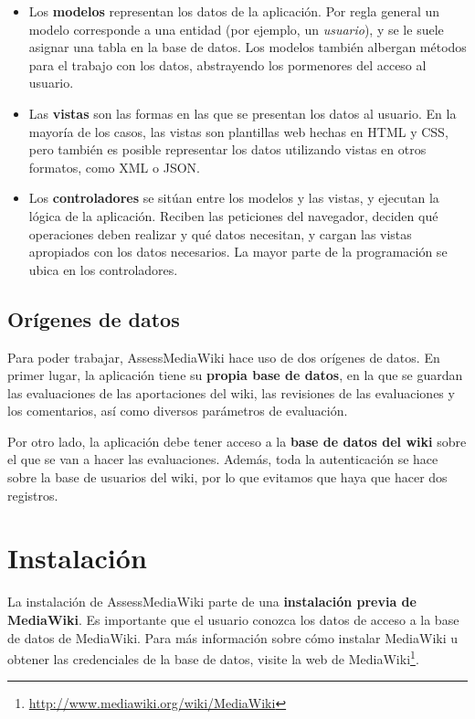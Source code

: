 \documentclass[11pt]{article}
\begin{document}
\begin{itemize}
\item Los \textbf{modelos} representan los datos de la aplicación. Por regla
  general un modelo corresponde a una entidad (por ejemplo, un
  \textit{usuario}), y se le suele asignar una tabla en la base de datos. Los
  modelos también albergan métodos para el trabajo con los datos, abstrayendo
  los pormenores del acceso al usuario.
\item Las \textbf{vistas} son las formas en las que se presentan los datos al
  usuario. En la mayoría de los casos, las vistas son plantillas web hechas en
  HTML y CSS, pero también es posible representar los datos utilizando vistas en
  otros formatos, como XML o JSON.
\item Los \textbf{controladores} se sitúan entre los modelos y las vistas, y
  ejecutan la lógica de la aplicación. Reciben las peticiones del navegador,
  deciden qué operaciones deben realizar y qué datos necesitan, y cargan las
  vistas apropiados con los datos necesarios. La mayor parte de la programación
  se ubica en los controladores.
\end{itemize}

\subsection{Orígenes de datos}

Para poder trabajar, AssessMediaWiki hace uso de dos orígenes de datos. En
primer lugar, la aplicación tiene su \textbf{propia base de datos}, en la que se
guardan las evaluaciones de las aportaciones del wiki, las revisiones de las
evaluaciones y los comentarios, así como diversos parámetros de evaluación.

Por otro lado, la aplicación debe tener acceso a la \textbf{base de datos del
  wiki} sobre el que se van a hacer las evaluaciones. Además, toda la
autenticación se hace sobre la base de usuarios del wiki, por lo que evitamos
que haya que hacer dos registros.

\section{Instalación}

La instalación de AssessMediaWiki parte de una \textbf{instalación previa de
  MediaWiki}. Es importante que el usuario conozca los datos de acceso a la base
de datos de MediaWiki. Para más información sobre cómo instalar MediaWiki u
obtener las credenciales de la base de datos, visite la web de
MediaWiki\footnote{\url{http://www.mediawiki.org/wiki/MediaWiki}}.
\end{document}
